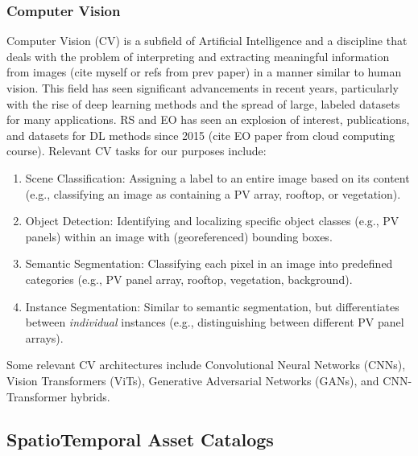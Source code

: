 \begin{multicols}{2}


\subsubsection{Computer Vision}

Computer Vision (CV) is a subfield of Artificial Intelligence and a discipline that deals with the problem of interpreting and extracting meaningful information from images (cite myself or refs from prev paper) 
in a manner similar to human vision. This field has seen significant advancements in recent years, particularly with the rise of deep learning methods and the spread of large, labeled datasets for many applications. 
RS and EO has seen an explosion of interest, publications, and datasets for DL methods since 2015 (cite EO paper from cloud computing course). Relevant CV tasks for our purposes include:

\begin{enumerate}
    \item Scene Classification: Assigning a label to an entire image based on its content (e.g., classifying an image as containing a PV array, rooftop, or vegetation).
    \item Object Detection: Identifying and localizing specific object classes (e.g., PV panels) within an image with (georeferenced) bounding boxes.
    \item Semantic Segmentation: Classifying each pixel in an image into predefined categories (e.g., PV panel array, rooftop, vegetation, background).
    \item Instance Segmentation: Similar to semantic segmentation, but differentiates between \textit{individual} instances (e.g., distinguishing between different PV panel arrays). 
\end{enumerate}

Some relevant CV architectures include Convolutional Neural Networks (CNNs), Vision Transformers (ViTs), Generative Adversarial Networks (GANs), and CNN-Transformer hybrids. 


\subsection{SpatioTemporal Asset Catalogs}


\end{multicols}

